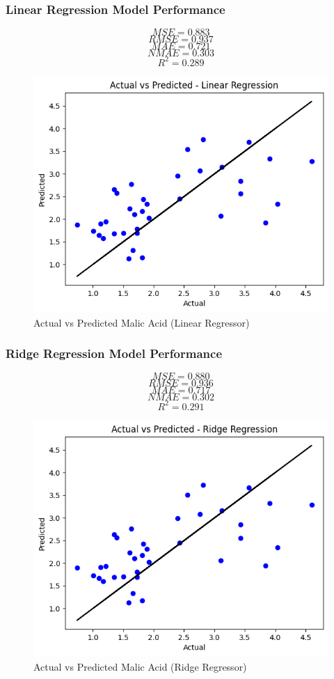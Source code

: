 \documentclass[twocolumn]{article}
\begin{document}
	\subsubsection{Linear Regression Model Performance}

	\[
		MSE = 0.883
	\]
	\[
		RMSE = 0.937
	\]
	\[
		MAE = 0.721
	\]
	\[
		NMAE = 0.303
	\]
	\[
		R^{2}= 0.289
	\]

	\begin{figure}[H]
		\centering
		\includegraphics[width=.8\linewidth]{AvP LR.png}
		\caption{Actual vs Predicted Malic Acid (Linear Regressor)}
	\end{figure}
	\subsubsection{Ridge Regression Model Performance}
	\[
		MSE = 0.880
	\]
	\[
		RMSE = 0.936
	\]
	\[
		MAE = 0.717
	\]
	\[
		NMAE = 0.302
	\]
	\[
		R^{2}= 0.291
	\]
	\begin{figure}[H]
		\centering
		\includegraphics[width=.8\linewidth]{AvP RR.png}
		\caption{Actual vs Predicted Malic Acid (Ridge Regressor)}
	\end{figure}
\end{document}
